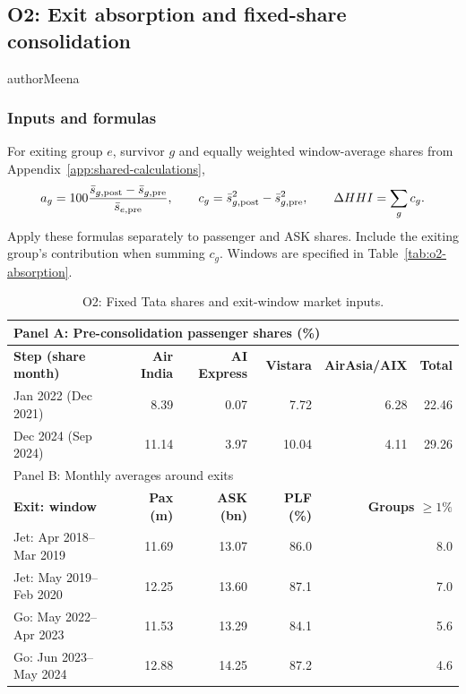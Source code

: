 \subsection{O2: Exit absorption and fixed-share consolidation}
\label{app:results-o2}
\begin{mergedcontribution}{authorMeena}
\subsubsection{Inputs and formulas}
\label{app:o2-definitions}
For exiting group $e$, survivor $g$ and equally weighted window-average shares from Appendix~\ref{app:shared-calculations},
\[
a_g=100\frac{\bar s_{g,\mathrm{post}}-\bar s_{g,\mathrm{pre}}}{\bar s_{e,\mathrm{pre}}},\qquad
c_g=\bar s_{g,\mathrm{post}}^2-\bar s_{g,\mathrm{pre}}^2,\qquad
\Delta HHI=\sum_g c_g.
\]
Apply these formulas separately to passenger and ASK shares. Include the exiting group's contribution when summing $c_g$. Windows are specified in Table~\ref{tab:o2-absorption}.

\begin{table}[H]
\centering
\color{authorMeena}
\caption{O2: Fixed Tata shares and exit-window market inputs.}\label{tab:o2-tata}\label{tab:o2-market}
\fontsize{10}{12}\selectfont{}\setlength{\tabcolsep}{3pt}
\renewcommand{\arraystretch}{1.15}
\begin{tabular}{|l|r|r|r|r|r|}
\hline
\multicolumn{6}{|l|}{Panel A: Pre-consolidation passenger shares (\%)}\\
\hline
\textbf{Step (share month)} & \textbf{Air India} & \textbf{AI Express} & \textbf{Vistara} & \textbf{AirAsia/AIX} & \textbf{Total}\\
\hline
Jan 2022 (Dec 2021) & 8.39 & 0.07 & 7.72 & 6.28 & 22.46\\
\hline
Dec 2024 (Sep 2024) & 11.14 & 3.97 & 10.04 & 4.11 & 29.26\\
\hline
\multicolumn{6}{|l|}{Panel B: Monthly averages around exits}\\
\hline
\textbf{Exit: window} & \textbf{Pax (m)} & \textbf{ASK (bn)} & \textbf{PLF (\%)} & \multicolumn{2}{r|}{\textbf{Groups $\geq1\%$}}\\
\hline
Jet: Apr 2018--Mar 2019 & 11.69 & 13.07 & 86.0 & \multicolumn{2}{r|}{8.0}\\
\hline
Jet: May 2019--Feb 2020 & 12.25 & 13.60 & 87.1 & \multicolumn{2}{r|}{7.0}\\
\hline
Go: May 2022--Apr 2023 & 11.53 & 13.29 & 84.1 & \multicolumn{2}{r|}{5.6}\\
\hline
Go: Jun 2023--May 2024 & 12.88 & 14.25 & 87.2 & \multicolumn{2}{r|}{4.6}\\
\hline
\end{tabular}
\end{table}


\end{mergedcontribution}
